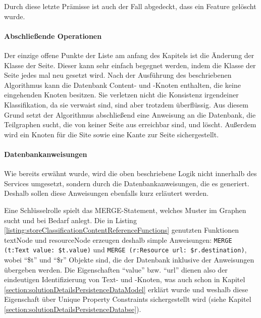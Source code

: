     Durch diese letzte Prämisse ist auch der Fall abgedeckt,
    dass ein Feature gelöscht wurde.

    \paragraph{Abschließende Operationen}
    Der einzige offene Punkte der Liste am anfang des Kapitels ist die Änderung der Klasse der Seite.
    Dieser kann sehr einfach begegnet werden, indem die Klasse der Seite jedes mal neu gesetzt wird.
    Nach der Ausführung des beschriebenen Algorithmus kann die Datenbank
    Content- und {\resource}-Knoten enthalten, die keine eingehenden Knoten besitzen.
    Sie verletzen nicht die Konsistenz irgendeiner Klassifikation, da sie verwaist sind,
    sind aber trotzdem überflüssig.
    Aus diesem Grund setzt der Algorithmus abschließend eine Anweisung an die Datenbank,
    die Teilgraphen sucht, die von keiner Seite aus erreichbar sind, und löscht.
    Außerdem wird ein Knoten für die Site sowie eine Kante zur Seite sichergestellt.

    \paragraph{Datenbankanweisungen}
    Wie bereits erwähnt wurde, wird die oben beschriebene Logik nicht innerhalb
    des Services umgesetzt, sondern durch die Datenbankanweisungen, die es generiert.
    Deshalb sollen diese Anweisungen ebenfalls kurz erläutert werden.
    
    Eine Schlüsselrolle spielt das MERGE-Statement,
    welches Muster im Graphen sucht und bei Bedarf anlegt.
    Die in Listing \ref{listing:storeClassificationContentReferenceFunctions} genutzten
    Funktionen textNode und resourceNode erzeugen deshalb simple Anweisungen:
    \texttt{MERGE (t:Text {value: \$t.value})} und \texttt{MERGE (r:Resource {url: \$r.destination})},
    wobei "`\$t"' und "`\$r"' Objekte sind, die der Datenbank inklusive der Anweisungen übergeben werden.
    Die Eigenschaften "`value"' bzw. "`url"' dienen also der eindeutigen Identifizierung von
    Text- und {\resource}-Knoten, was auch schon in Kapitel
    \ref{section:solutionDetailsPersistenceDataModel} erklärt wurde
    und weshalb diese Eigenschaft über Unique Property Constraints sichergestellt wird
    (siehe Kapitel \ref{section:solutionDetailsPersistenceDatabse}).

